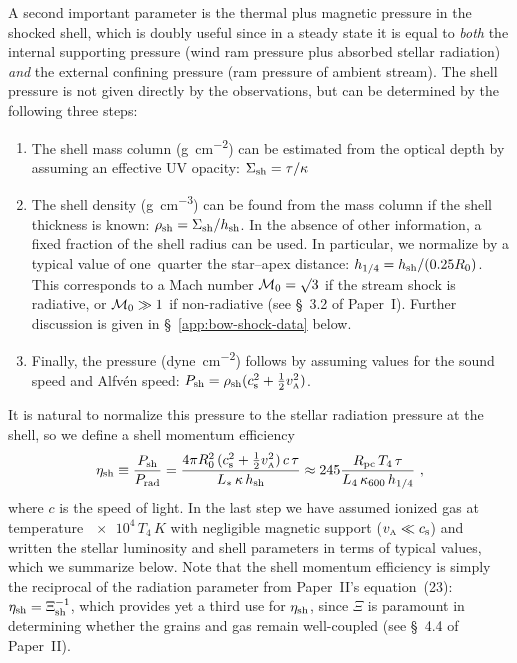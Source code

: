 A second important parameter is the thermal plus magnetic pressure in
the shocked shell, which is doubly useful since in a steady state it
is equal to \emph{both} the internal supporting pressure (wind ram
pressure plus absorbed stellar radiation) \emph{and} the external
confining pressure (ram pressure of ambient stream).  The shell
pressure is not given directly by the observations, but can be
determined by the following three steps:
\begin{enumerate}[P1.]
\item \label{P1} The shell mass column (\si{g.cm^{-2}}) can be
  estimated from the optical depth by assuming an effective UV
  opacity: \(\Sigma_{\text{sh}} = \tau / \kappa\)
\item \label{P2} The shell density (\si{g.cm^{-3}}) can be found from
  the mass column if the shell thickness is known:
  \(\rho_{\text{sh}} = \Sigma_{\text{sh}} / h_{\text{sh}}\).  In the absence of other information, a
  fixed fraction of the shell radius can be used.  In particular, we
  normalize by a typical value of one~quarter the star--apex distance:
  \(h_{1/4} = h_{\text{sh}} / (0.25 R_0)\).  This corresponds to a Mach
  number \(\mathcal{M}_0 = \surd 3\) if the stream shock is radiative, or
  \(\mathcal{M}_0 \gg 1\) if non-radiative (see \S~3.2 of Paper~I). Further
  discussion is given in \S~\ref{app:bow-shock-data} below. 
\item \label{P3} Finally, the pressure (\si{dyne.cm^{-2}}) follows by
  assuming values for the sound speed and Alfvén speed:
  \(P_{\text{sh}} = \rho_{\text{sh}} (c_{\text{s}}^2 + \frac12 v_{\scriptscriptstyle\text{A}}^2) \).
\end{enumerate}
It is natural to normalize this pressure to the stellar radiation
pressure at the shell, so we define a shell momentum efficiency
\newcommand\pc{\ensuremath{_{\text{pc}}}}
\begin{equation}
  \label{eq:eta-shell}
  \eta\shell \equiv \frac{P\shell}{P\rad}
  = \frac{4\pi R_0^2\, (\sound^2 + \frac12 v\alfven^2)\, c\, \tau}{L_*\, \kappa\, h\shell}
  \approx 245 \frac{R\pc \, T_4 \, \tau}{L_4 \, \kappa_{600} \, h_{1/4}} \ , 
\end{equation}
where \(c\) is the speed of light. In the last step we have assumed
ionized gas at temperature \(\num{e4}\,T_4\,\si{K}\) with negligible
magnetic support (\(v_{\scriptscriptstyle\text{A}} \ll c_{\text{s}}\)) and written the stellar
luminosity and shell parameters in terms of typical values, which we
summarize below.  Note that the shell momentum efficiency is simply
the reciprocal of the radiation parameter from Paper~II's
equation~(23): \(\eta_{\text{sh}} = \Xi_{\text{sh}}^{-1}\), which provides yet a third
use for \(\eta_{\text{sh}}\), since \(\Xi\) is paramount in determining whether
the grains and gas remain well-coupled (see \S~4.4 of Paper~II).

